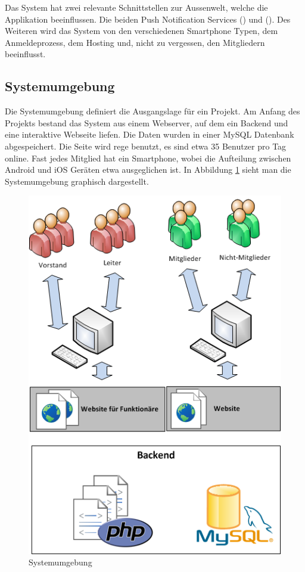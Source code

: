 Das System hat zwei relevante Schnittstellen zur Aussenwelt, welche die Applikation beeinflussen. Die beiden Push Notification Services  () und  (). Des Weiteren wird das System von den verschiedenen Smartphone Typen, dem Anmeldeprozess, dem Hosting und, nicht zu vergessen, den Mitgliedern beeinflusst.

\subsection{Systemumgebung}\label{systemumgebung}
Die Systemumgebung definiert die Ausgangslage für ein Projekt. Am Anfang des Projekts bestand das System aus einem Webserver, auf dem ein  Backend und eine interaktive Webseite liefen. Die Daten wurden in einer MySQL Datenbank abgespeichert. Die Seite wird rege benutzt, es sind etwa 35 Benutzer pro Tag online. Fast jedes Mitglied hat ein Smartphone, wobei die Aufteilung zwischen Android und iOS Geräten etwa ausgeglichen ist. In Abbildung \ref{fig:systemumgebung} sieht man die Systemumgebung graphisch dargestellt.
\begin{figure}[h]
\centering
\includegraphics[scale=0.8]{images/visio/systemumgebung.png}
\caption{Systemumgebung}
\label{fig:systemumgebung}
\end{figure}

